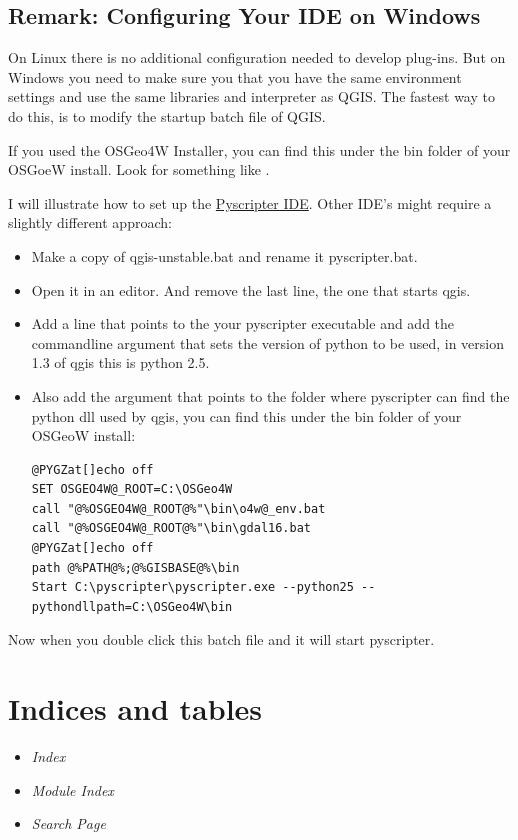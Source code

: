 \documentclass[letterpaper,10pt,english]{manual}
\begin{document}
\section{Remark: Configuring Your IDE on Windows}

On Linux there is no additional configuration needed to develop plug-ins. But on Windows you need to make sure you that you have the same
environment settings and use the same libraries and interpreter as QGIS. The fastest way to do this, is to modify the startup batch file of QGIS.

If you used the OSGeo4W Installer, you can find this under the bin folder of your OSGoeW install. Look for something like .

I will illustrate how to set up the \href{http://code.google.com/p/pyscripter}{Pyscripter IDE}. Other IDE’s might require a slightly different approach:
\begin{itemize}
\item {} 
Make a copy of qgis-unstable.bat and rename it pyscripter.bat.

\item {} 
Open it in an editor. And remove the last line, the one that starts qgis.

\item {} 
Add a line that points to the your pyscripter executable and add the commandline argument that sets the version of python to be used, in version 1.3 of qgis this is python 2.5.

\item {} 
Also add the argument that points to the folder where pyscripter can find the python dll used by qgis, you can find this under the bin folder of your OSGeoW install:

\begin{Verbatim}[commandchars=@\[\]]
@PYGZat[]echo off
SET OSGEO4W@_ROOT=C:\OSGeo4W
call "@%OSGEO4W@_ROOT@%"\bin\o4w@_env.bat
call "@%OSGEO4W@_ROOT@%"\bin\gdal16.bat
@PYGZat[]echo off
path @%PATH@%;@%GISBASE@%\bin
Start C:\pyscripter\pyscripter.exe --python25 --pythondllpath=C:\OSGeo4W\bin
\end{Verbatim}

\end{itemize}

Now when you double click this batch file and it will start pyscripter.


\chapter{Indices and tables}
\begin{itemize}
\item {} 
\emph{Index}

\item {} 
\emph{Module Index}

\item {} 
\emph{Search Page}

\end{itemize}


\renewcommand{\indexname}{Module Index}
\printmodindex
\renewcommand{\indexname}{Index}
\printindex
\end{document}
